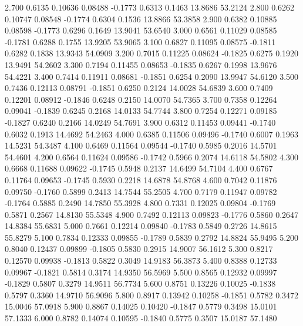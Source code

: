    2.700   0.6135   0.10636   0.08488  -0.1773   0.6313   0.1463  13.8686  53.2124
   2.800   0.6262   0.10747   0.08548  -0.1774   0.6304   0.1536  13.8866  53.3858
   2.900   0.6382   0.10885   0.08598  -0.1773   0.6296   0.1649  13.9041  53.6540
   3.000   0.6561   0.11029   0.08585  -0.1781   0.6288   0.1755  13.9205  53.9065
   3.100   0.6827   0.11095   0.08575  -0.1811   0.6282   0.1838  13.9343  54.0909
   3.200   0.7015   0.11225   0.08624  -0.1825   0.6275   0.1920  13.9491  54.2602
   3.300   0.7194   0.11455   0.08653  -0.1835   0.6267   0.1998  13.9676  54.4221
   3.400   0.7414   0.11911   0.08681  -0.1851   0.6254   0.2090  13.9947  54.6120
   3.500   0.7436   0.12113   0.08791  -0.1851   0.6250   0.2124  14.0028  54.6839
   3.600   0.7409   0.12201   0.08912  -0.1846   0.6248   0.2150  14.0070  54.7365
   3.700   0.7358   0.12264   0.09041  -0.1839   0.6245   0.2168  14.0133  54.7744
   3.800   0.7254   0.12271   0.09185  -0.1827   0.6240   0.2166  14.0249  54.7691
   3.900   0.6312   0.11453   0.09441  -0.1740   0.6032   0.1913  14.4692  54.2463
   4.000   0.6385   0.11506   0.09496  -0.1740   0.6007   0.1963  14.5231  54.3487
   4.100   0.6469   0.11564   0.09544  -0.1740   0.5985   0.2016  14.5701  54.4601
   4.200   0.6564   0.11624   0.09586  -0.1742   0.5966   0.2074  14.6118  54.5802
   4.300   0.6668   0.11688   0.09622  -0.1745   0.5948   0.2137  14.6499  54.7104
   4.400   0.6767   0.11764   0.09653  -0.1745   0.5930   0.2218  14.6878  54.8768
   4.600   0.7042   0.11876   0.09750  -0.1760   0.5899   0.2413  14.7544  55.2505
   4.700   0.7179   0.11947   0.09782  -0.1764   0.5885   0.2490  14.7850  55.3928
   4.800   0.7331   0.12025   0.09804  -0.1769   0.5871   0.2567  14.8130  55.5348
   4.900   0.7492   0.12113   0.09823  -0.1776   0.5860   0.2647  14.8384  55.6831
   5.000   0.7661   0.12214   0.09840  -0.1783   0.5849   0.2726  14.8615  55.8279
   5.100   0.7834   0.12333   0.09855  -0.1789   0.5839   0.2792  14.8824  55.9495
   5.200   0.8040   0.12437   0.09899  -0.1805   0.5830   0.2915  14.9007  56.1612
   5.300   0.8217   0.12570   0.09938  -0.1813   0.5822   0.3049  14.9183  56.3873
   5.400   0.8388   0.12733   0.09967  -0.1821   0.5814   0.3174  14.9350  56.5969
   5.500   0.8565   0.12932   0.09997  -0.1829   0.5807   0.3279  14.9511  56.7734
   5.600   0.8751   0.13226   0.10025  -0.1838   0.5797   0.3360  14.9710  56.9096
   5.800   0.8917   0.13942   0.10258  -0.1851   0.5782   0.3472  15.0046  57.0918
   5.900   0.8867   0.14025   0.10420  -0.1847   0.5779   0.3498  15.0101  57.1333
   6.000   0.8782   0.14074   0.10595  -0.1840   0.5775   0.3507  15.0187  57.1480
